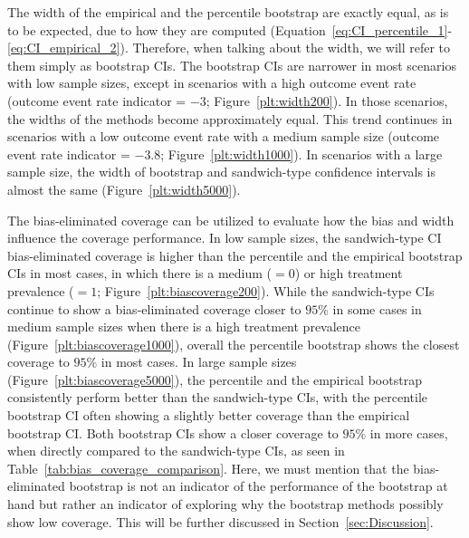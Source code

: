 \documentclass[pdflatex,sn-vancouver-ay]{sn-jnl}%
\theoremstyle{thmstyleone}%
\theoremstyle{thmstyletwo}%
\theoremstyle{thmstylethree}%
\begin{document}
The width of the empirical and the percentile bootstrap are exactly equal, as is to be expected, due to how they are computed (Equation~\ref{eq:CI_percentile_1}-\ref{eq:CI_empirical_2}). Therefore, when talking about the width, we will refer to them simply as bootstrap CIs. The bootstrap CIs are narrower in most scenarios with low sample sizes, except in scenarios with a high outcome event rate (outcome event rate indicator = $-3$; Figure~\ref{plt:width200}). In those scenarios, the widths of the methods become approximately equal. This trend continues in scenarios with a low outcome event rate with a medium sample size (outcome event rate indicator = $-3.8$; Figure~\ref{plt:width1000}). In scenarios with a large sample size, the width of bootstrap and sandwich-type confidence intervals is almost the same (Figure~\ref{plt:width5000}). 

The bias-eliminated coverage can be utilized to evaluate how the bias and width influence the coverage performance. In low sample sizes, the sandwich-type CI bias-eliminated coverage is higher than the percentile and the empirical bootstrap CIs in most cases, in which there is a medium ($= 0$) or high treatment prevalence ($= 1$; Figure~\ref{plt:biascoverage200}). While the sandwich-type CIs continue to show a bias-eliminated coverage closer to $95\%$ in some cases in medium sample sizes when there is a high treatment prevalence (Figure~\ref{plt:biascoverage1000}), overall the percentile bootstrap shows the closest coverage to $95\%$ in most cases. In large sample sizes (Figure~\ref{plt:biascoverage5000}), the percentile and the empirical bootstrap consistently perform better than the sandwich-type CIs, with the percentile bootstrap CI often showing a slightly better coverage than the empirical bootstrap CI. Both bootstrap CIs show a closer coverage to $95\%$ in more cases, when directly compared to the sandwich-type CIs, as seen in Table~\ref{tab:bias_coverage_comparison}. Here, we must mention that the bias-eliminated bootstrap is not an indicator of the performance of the bootstrap at hand but rather an indicator of exploring why the bootstrap methods possibly show low coverage. This will be further discussed in Section~\ref{sec:Discussion}.
\end{document}
